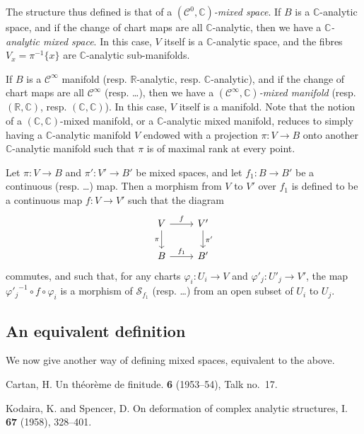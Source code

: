 \documentclass{article}
\theoremstyle{plain}
\theoremstyle{definition}
\newcommand{\RR}{\mathbb{R}}
\newcommand{\CC}{\mathbb{C}}
\newcommand{\oldpage}[1]{\marginpar{\footnotesize$\Big\vert$ \textit{p.~#1}}}
\begin{document}
The structure thus defined is that of a \emph{$(\mathscr{C}^0,\CC)$-mixed space}.
If $B$ is a $\CC$-analytic space, and if the change of chart maps are all $\CC$-analytic, then we have a \emph{$\CC$-analytic mixed space}.
In this case, $V$ itself is a $\CC$-analytic space, and the fibres $V_x=\pi^{-1}\{x\}$ are $\CC$-analytic sub-manifolds.

If $B$ is a $\mathscr{C}^\infty$ manifold (resp. $\RR$-analytic, resp. $\CC$-analytic), and if the change of chart maps are all $\mathscr{C}^\infty$ (resp. \ldots), then we have a \emph{$(\mathscr{C}^\infty,\CC)$-mixed manifold} (resp. $(\RR,\CC)$, resp. $(\CC,\CC)$).
In this case, $V$ itself is a manifold.
Note that the notion of a $(\CC,\CC)$-mixed manifold, or a $\CC$-analytic mixed manifold, reduces to simply having a $\CC$-analytic manifold $V$ endowed with a projection $\pi\colon V\to B$ onto another $\CC$-analytic manifold such that $\pi$ is of maximal rank at every point.

Let $\pi\colon V\to B$ and $\pi'\colon V'\to B'$ be mixed spaces, and let $f_1\colon B\to B'$ be a continuous (resp. \ldots) map.
Then a morphism from $V$ to $V'$ over $f_1$ is defined to be a continuous map $f\colon V\to V'$ such that the diagram
\[
  \begin{tikzcd}
    V \rar["f"] \dar[swap,"\pi"]
    & V' \dar["\pi'"]
  \\B \rar["f_1"]
    & B'
  \end{tikzcd}
\]
\oldpage{2-03}
commutes, and such that, for any charts $\varphi_i\colon U_i\to V$ and $\varphi'_j\colon U'_j\to V'$, the map ${\varphi'_j}^{-1}\circ f\circ\varphi_i$ is a morphism of $\mathscr{S}_{f_1}$ (resp. \ldots) from an open subset of $U_i$ to $U_j$.


\subsection{An equivalent definition}
\label{II.2}

We now give another way of defining mixed spaces, equivalent to the above.




\nocite{*}

\begin{thebibliography}{2}

  {\sc Cartan, H.}
  \newblock Un th\'{e}or\`{e}me de finitude.
   \textbf{6} (1953--54), Talk no.~17.

  {\sc Kodaira, K. and Spencer, D.}
  \newblock On deformation of complex analytic structures, I.
   \textbf{67} (1958), 328--401.

\end{thebibliography}
\end{document}
